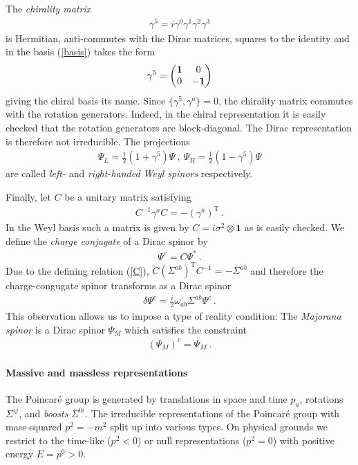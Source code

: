 \documentclass[12pt]{article}
\begin{document}
The {\em chirality matrix}
\begin{eqnarray}
\gamma^5=i \gamma^0 \gamma^1\gamma^2\gamma^3
\end{eqnarray}
is Hermitian, anti-commutes with the Dirac matrices, squares to the identity and in the basis (\ref{basis}) takes the form
\begin{eqnarray}
\gamma^5=\begin{pmatrix} \bf 1&0\\0&-\bf 1\end{pmatrix}
\end{eqnarray}
giving the chiral basis its name. Since $\{\gamma^5, \gamma^a\}=0$, the chirality matrix commutes with the rotation generators. Indeed, in the chiral representation it is easily checked that the rotation generators are block-diagonal. The Dirac representation is therefore not irreducible. The projections 
\begin{eqnarray}
\Psi_L = \frac 12(1+\gamma^5)\Psi ~,~ \Psi_R = \frac 12( 1-\gamma^5)\Psi
\end{eqnarray}
are called {\em left-} and {\em right-handed Weyl spinors} respectively. 

Finally, let $C$ be a unitary matrix satisfying 
\begin{eqnarray}
\label{C}
C^{-1} \gamma^a C=-(\gamma^a)^\mathrm T~.
\end{eqnarray}
In the Weyl basis such a matrix is given by $C=i\sigma^2\otimes \mathbf 1$ as is easily checked. We define the {\em charge conjugate} of a Dirac spinor by
\begin{eqnarray}
\Psi^c= C \Psi^*~.
\end{eqnarray}
Due to the defining relation (\ref{C}), $C(\Sigma^{ab})^\mathrm T C^{-1}=-\Sigma^{ab}$ and therefore the charge-congugate spinor transforms as a Dirac spinor
\begin{eqnarray}
\delta \Psi^c=\frac i2 \omega_{ab}\Sigma^{ab}\Psi^c~.
\end{eqnarray}
This observation allows us to impose a type of reality condition: The {\em Majorana spinor} is a Dirac spinor $\Psi_M$ which satisfies the constraint 
\begin{eqnarray}
(\Psi_M)^c=\Psi_M~.
\end{eqnarray}

\paragraph{Massive and massless representations} The Poincar\'e group is generated by translations in space and time $p_a$, rotations $\Sigma^{ij}$, and {\em boosts} $\Sigma^{0i}$. The irreducible representations of the Poincar\'e group with mass-squared $p^2=-m^2$ split up into various types. On physical grounds we restrict to the time-like ($p^2<0$) or null representations ($p^2=0$) with positive energy $E=p^0>0$. 
\end{document}
